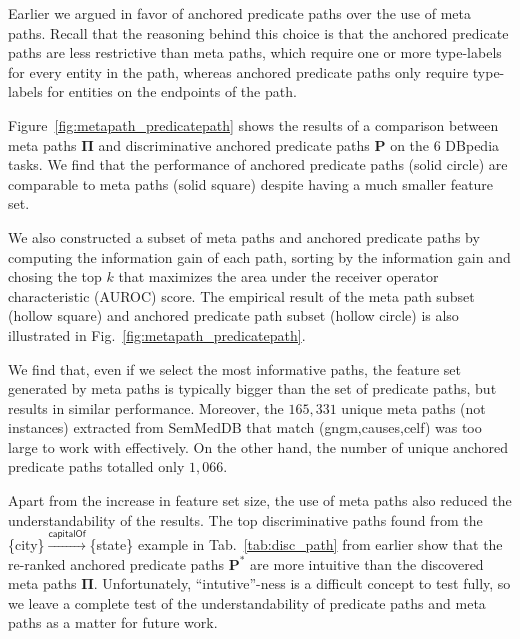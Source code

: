 \documentclass[reprint,twocolumn,showpacs,preprintnumbers,amsmath, aps,pre,amssymb]{revtex4-1}
\begin{document}
Earlier we argued in favor of anchored predicate paths over the use of meta paths. Recall that the reasoning behind this choice is that the anchored predicate paths are less restrictive than meta paths, which require one or more type-labels for every entity in the path, whereas anchored predicate paths only require type-labels for entities on the endpoints of the path.



Figure~\ref{fig:metapath_predicatepath} shows the results of a comparison between meta paths $\mathbf{\Pi}$ and discriminative anchored predicate paths $\mathbf{P}$ on the 6 DBpedia tasks. We find that the performance of anchored predicate paths (solid circle) are comparable to meta paths (solid square) despite having a much smaller feature set.

We also constructed a subset of meta paths and anchored predicate paths by computing the information gain of each path, sorting by the information gain and chosing the top $k$ that maximizes the area under the receiver operator characteristic (AUROC) score. The empirical result of the meta path subset (hollow square) and anchored predicate path subset (hollow circle) is also illustrated in Fig.~\ref{fig:metapath_predicatepath}. 

We find that, even if we select the most informative paths, the feature set generated by meta paths is typically bigger than the set of predicate paths, but results in similar performance. Moreover, the $165,331$ unique meta paths (not instances) extracted from SemMedDB that match (\textsf{gngm},\textsf{causes},\textsf{celf}) was too large to work with effectively. On the other hand, the number of unique anchored predicate paths totalled only $1,066$.

Apart from the increase in feature set size, the use of meta paths also reduced the understandability of the results. The top discriminative paths found from the \{\textsf{city}\}$\xrightarrow{\textsf{capitalOf}}$\{\textsf{state}\} example in Tab.~\ref{tab:disc_path} from earlier show that the re-ranked anchored predicate paths $\mathbf{P}^*$ are more intuitive than the discovered meta paths $\mathbf{\Pi}$. Unfortunately, ``intutive''-ness is a difficult concept to test fully, so we leave a complete test of the understandability of predicate paths and meta paths as a matter for future work.
\end{document}
